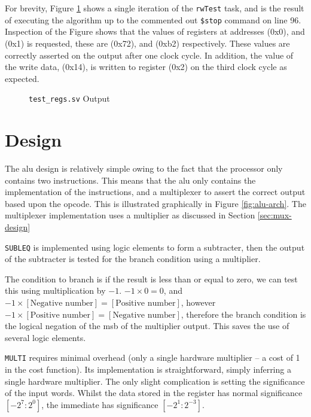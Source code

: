 For brevity, Figure \ref{fig:test-regs} shows a single iteration of the \texttt{rwTest} task, and is the result of executing the algorithm up to the commented out \texttt{\$stop} command on line 96. Inspection of the Figure shows that the values of registers at addresses (0x0), and (0x1) is requested, these are (0x72), and (0xb2) respectively. These values are correctly asserted on the output after one clock cycle. In addition, the value of the write data, (0x14), is written to register (0x2) on the third clock cycle as expected.



\begin{figure}[ht]
	\centering
	
	\caption{\texttt{test\_regs.sv} Output}
	\label{fig:test-regs}
\end{figure}

\section{ Design} \label{sec:alu-design}

The \gls{alu} design is relatively simple owing to the fact that the processor only contains two instructions. This means that the \gls{alu} only contains the implementation of the instructions, and a multiplexer to assert the correct output based upon the opcode. This is illustrated graphically in Figure \ref{fig:alu-arch}. The multiplexer implementation uses a multiplier as discussed in Section \ref{sec:mux-design}

\texttt{SUBLEQ} is implemented using logic elements to form a subtracter, then the output of the subtracter is tested for the branch condition using a multiplier.

The condition to branch is if the result is less than or equal to zero, we can test this using multiplication by $-1$. $-1 \times 0 = 0$, and $-1 \times [\text{Negative number}] = [\text{Positive number}]$, however $-1 \times [\text{Positive number}] = [\text{Negative number}]$, therefore the branch condition is the logical negation of the \gls{msb} of the multiplier output. This saves the use of several logic elements.

\texttt{MULTI} requires minimal overhead (only a single hardware multiplier -- a cost of 1 in the cost function). Its implementation is straightforward, simply inferring a single hardware multiplier. The only slight complication is setting the significance of the input words. Whilst the data stored in the register has normal significance $[-2^7: 2^0]$, the immediate has significance $[-2^1: 2^{-3}]$.

